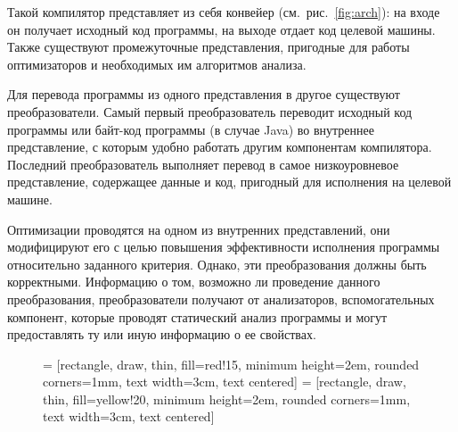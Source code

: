 \documentclass[14pt,titlepage]{extarticle}
\begin{document}
      Такой компилятор представляет из себя конвейер (см.~рис.~\ref{fig:arch}):
      на входе он получает исходный код программы, на выходе отдает код целевой
      машины.
      Также существуют промежуточные представления, пригодные для работы
      оптимизаторов и необходимых им алгоритмов анализа.

      Для перевода программы из одного представления в другое существуют
      преобразователи.
      Самый первый преобразователь переводит исходный код программы
      или байт-код программы (в случае Java)
      во внутреннее представление, с которым удобно работать другим
      компонентам компилятора.
      Последний преобразователь выполняет перевод в самое низкоуровневое
      представление, содержащее данные и код, пригодный для исполнения
      на целевой машине.

      Оптимизации проводятся на одном из внутренних представлений, они
      модифицируют его с целью повышения эффективности исполнения программы
      относительно заданного критерия. Однако, эти преобразования должны быть
      корректными. Информацию о том, возможно ли проведение данного
      преобразования, преобразователи получают от анализаторов, вспомогательных
      компонент, которые проводят статический анализ программы и могут
      предоставлять ту или иную информацию о ее свойствах.

      \begin{figure}[!htb]
        \centering

         = [rectangle, draw, thin, fill=red!15,
                            minimum height=2em, rounded corners=1mm,
                            text width=3cm, text centered]
         =  [rectangle, draw, thin, fill=yellow!20,
                            minimum height=2em, rounded corners=1mm,
                            text width=3cm, text centered]

      \end{figure}
\end{document}

